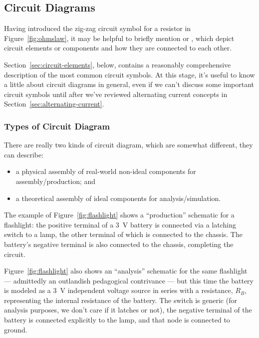 \subsection{Circuit Diagrams}

Having introduced the zig-zag circuit symbol for a resistor in
Figure~\ref{fig:ohmslaw}, it may be helpful to briefly mention
 or , which depict circuit
elements or components and how they are connected to each other.

Section~\ref{sec:circuit-elements}, below, contains a reasonably
comprehensive description of the most common circuit symbols. At this
stage, it's useful to know a little about circuit diagrams in general,
even if we can't discuss some important circuit symbols until after
we've reviewed alternating current concepts in
Section~\ref{sec:alternating-current}.


\subsubsection{Types of Circuit Diagram}

There are really two kinds of circuit diagram, which are somewhat
different, they can describe:

\begin{itemize}
  \item a physical assembly of real-world non-ideal components for assembly/production; and
  \item a theoretical assembly of ideal components for analysis/simulation.
\end{itemize}

The example of Figure~\ref{fig:flashlight} shows a ``production''
schematic for a flashlight: the positive terminal of a 3~\unit{V}
battery is connected via a latching switch to a lamp, the other
terminal of which is connected to the chassis. The battery's negative
terminal is also connected to the chassis, completing the circuit.

Figure~\ref{fig:flashlight} also shows an ``analysis'' schematic for
the same flashlight --- admittedly an outlandish pedagogical
contrivance --- but this time the battery is modeled as a 3~\unit{V}
independent voltage source in series with a resistance, $R_B$,
representing the internal resistance of the battery. The switch is
generic (for analysis purposes, we don't care if it latches or not),
the negative terminal of the battery is connected explicitly to the
lamp, and that node is connected to ground.


